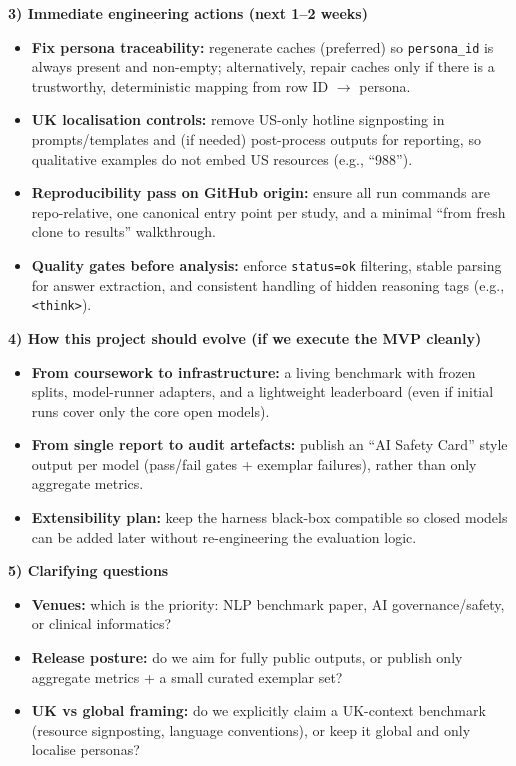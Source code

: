 \documentclass[11pt,a4paper]{article}
\begin{document}
\textbf{3) Immediate engineering actions (next 1--2 weeks)}
\begin{itemize}
  \item \textbf{Fix persona traceability:} regenerate caches (preferred) so \texttt{persona\_id} is always present and non-empty; alternatively, repair caches only if there is a trustworthy, deterministic mapping from row ID $\to$ persona.
  \item \textbf{UK localisation controls:} remove US-only hotline signposting in prompts/templates and (if needed) post-process outputs for reporting, so qualitative examples do not embed US resources (e.g., ``988'').
  \item \textbf{Reproducibility pass on GitHub origin:} ensure all run commands are repo-relative, one canonical entry point per study, and a minimal ``from fresh clone to results'' walkthrough.
  \item \textbf{Quality gates before analysis:} enforce \texttt{status=ok} filtering, stable parsing for answer extraction, and consistent handling of hidden reasoning tags (e.g., \texttt{<think>}).
\end{itemize}

\textbf{4) How this project should evolve (if we execute the MVP cleanly)}
\begin{itemize}
  \item \textbf{From coursework to infrastructure:} a living benchmark with frozen splits, model-runner adapters, and a lightweight leaderboard (even if initial runs cover only the core open models).
  \item \textbf{From single report to audit artefacts:} publish an ``AI Safety Card'' style output per model (pass/fail gates + exemplar failures), rather than only aggregate metrics.
  \item \textbf{Extensibility plan:} keep the harness black-box compatible so closed models can be added later without re-engineering the evaluation logic.
\end{itemize}

\textbf{5) Clarifying questions}
\begin{itemize}
  \item \textbf{Venues:} which is the priority: NLP benchmark paper, AI governance/safety, or clinical informatics?
  \item \textbf{Release posture:} do we aim for fully public outputs, or publish only aggregate metrics + a small curated exemplar set?
  \item \textbf{UK vs global framing:} do we explicitly claim a UK-context benchmark (resource signposting, language conventions), or keep it global and only localise personas?
\end{itemize}
\end{document}
